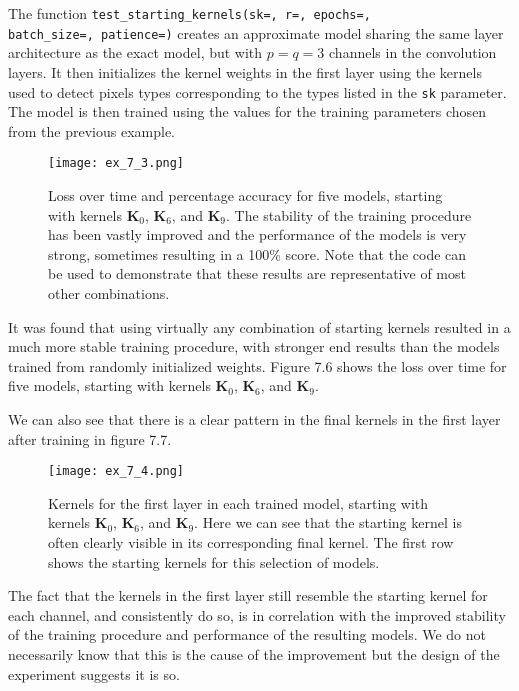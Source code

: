 \documentclass{somasmsc}
\begin{document}
\begin{exa}
The function \verb|test_starting_kernels(sk=, r=, epochs=,| \\ \verb|batch_size=, patience=)| creates an approximate model sharing the same layer architecture as the exact model, but with $p=q=3$ channels in the convolution layers. It then initializes the kernel weights in the first layer using the kernels used to detect pixels types corresponding to the types listed in the \verb|sk| parameter. The model is then trained using the values for the training parameters chosen from the previous example.

\begin{figure}[H]\label{digit:ex_7_3}
\begin{center}
\texttt{[image: ex\_7\_3.png]}
\end{center}
\caption{Loss over time and percentage accuracy for five models, starting with kernels $\mathbf{K}_0$, $\mathbf{K}_6$, and $\mathbf{K}_9$. The stability of the training procedure has been vastly improved and the performance of the models is very strong, sometimes resulting in a 100\% score. Note that the code can be used to demonstrate that these results are representative of most other combinations.}
\end{figure}

It was found that using virtually any combination of starting kernels resulted in a much more stable training procedure, with stronger end results than the models trained from randomly initialized weights. Figure 7.6 shows the loss over time for five models, starting with kernels $\mathbf{K}_0$, $\mathbf{K}_6$, and $\mathbf{K}_9$.

We can also see that there is a clear pattern in the final kernels in the first layer after training in figure 7.7.

\begin{figure}[H]\label{digit:ex_7_4}
\begin{center}
\texttt{[image: ex\_7\_4.png]}
\end{center}
\caption{Kernels for the first layer in each trained model, starting with kernels $\mathbf{K}_0$, $\mathbf{K}_6$, and $\mathbf{K}_9$. Here we can see that the starting kernel is often clearly visible in its corresponding final kernel. The first row shows the starting kernels for this selection of models.}
\end{figure}

The fact that the kernels in the first layer still resemble the starting kernel for each channel, and consistently do so, is in correlation with the improved stability of the training procedure and performance of the resulting models. We do not necessarily know that this is the cause of the improvement but the design of the experiment suggests it is so.
\end{exa}
\end{document}
